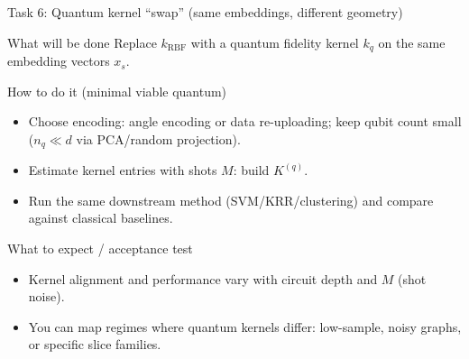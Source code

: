 \documentclass[aspectratio=169,xcolor={dvipsnames}]{beamer}
\begin{document}
\begin{frame}[shrink=20]{Task 6: Quantum kernel “swap” (same embeddings, different geometry)}
\small
\begin{block}{What will be done}
Replace $k_{\text{RBF}}$ with a quantum fidelity kernel $k_q$ on the same embedding vectors $x_s$.
\end{block}

\begin{block}{How to do it (minimal viable quantum)}
\begin{itemize}\setlength\itemsep{3pt}
\item Choose encoding: angle encoding or data re-uploading; keep qubit count small ($n_q\ll d$ via PCA/random projection).
\item Estimate kernel entries with shots $M$: build $K^{(q)}$.
\item Run the same downstream method (SVM/KRR/clustering) and compare against classical baselines.
\end{itemize}
\end{block}

\begin{block}{What to expect / acceptance test}
\begin{itemize}\setlength\itemsep{2pt}
\item Kernel alignment and performance vary with circuit depth and $M$ (shot noise).
\item You can map regimes where quantum kernels differ: low-sample, noisy graphs, or specific slice families.
\end{itemize}
\end{block}
\end{frame}
\end{document}
